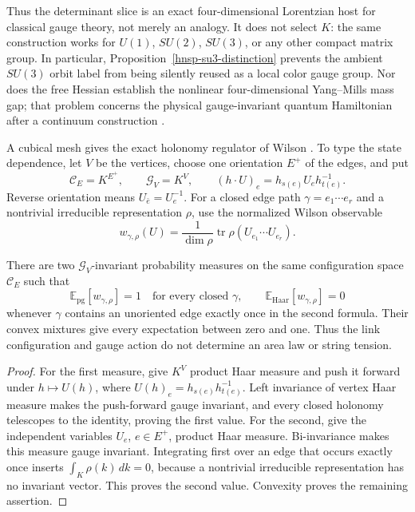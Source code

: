 Thus the determinant slice is an exact four-dimensional Lorentzian host for
classical gauge theory, not merely an analogy.  It does not select \(K\): the
same construction works for \(U(1)\), \(SU(2)\), \(SU(3)\), or any other
compact matrix group.  In particular, Proposition~\ref{hnsp-su3-distinction}
prevents the ambient \(SU(3)\) orbit label from being silently reused as a
local color gauge group.  Nor does the free Hessian establish the nonlinear
four-dimensional Yang--Mills mass gap; that problem concerns the physical
gauge-invariant quantum Hamiltonian after a continuum construction
\cite{JaffeWitten2000}.

A cubical mesh gives the exact holonomy regulator of Wilson
\cite{Wilson_1974}.  To type the state dependence, let \(V\) be the vertices,
choose one orientation \(E^+\) of the edges, and put
\begin{equation}
 \mathcal C_E=K^{E^+},\qquad \mathcal G_V=K^V,
 \qquad (h\cdot U)_e=h_{s(e)}U_e h_{t(e)}^{-1}.
 \label{hnsp-link-configuration}
\end{equation}
Reverse orientation means \(U_{\bar e}=U_e^{-1}\).  For a closed edge path
\(\gamma=e_1\cdots e_r\) and a nontrivial irreducible representation \(\rho\),
use the normalized Wilson observable
\begin{equation}
 w_{\gamma,\rho}(U)
 =\frac1{\dim\rho}\operatorname{tr}
   \rho(U_{e_1}\cdots U_{e_r}).
 \label{hnsp-normalized-link-wilson}
\end{equation}

\begin{proposition}
\label{hnsp-link-state-countermodels}
There are two \(\mathcal G_V\)-invariant probability measures on the same
configuration space \(\mathcal C_E\) such that
\begin{equation}
 \mathbb E_{\mathrm{pg}}[w_{\gamma,\rho}]=1
 \quad\text{for every closed }\gamma,
 \qquad
 \mathbb E_{\mathrm{Haar}}[w_{\gamma,\rho}]=0
 \label{hnsp-link-state-values}
\end{equation}
whenever \(\gamma\) contains an unoriented edge exactly once in the second
formula.  Their convex mixtures give every expectation between zero and one.
Thus the link configuration and gauge action do not determine an area law or
string tension.
\end{proposition}

\begin{proof}
For the first measure, give \(K^V\) product Haar measure and push it forward
under \(h\mapsto U(h)\), where
\(U(h)_e=h_{s(e)}h_{t(e)}^{-1}\).  Left invariance of vertex Haar measure
makes the push-forward gauge invariant, and every closed holonomy telescopes
to the identity, proving the first value.  For the second, give the independent
variables \(U_e\), \(e\in E^+\), product Haar measure.  Bi-invariance makes
this measure gauge invariant.  Integrating first over an edge that occurs
exactly once inserts
\(\int_K\rho(k)\,dk=0\), because a nontrivial irreducible representation has
no invariant vector.  This proves the second value.  Convexity proves the
remaining assertion.
\end{proof}


